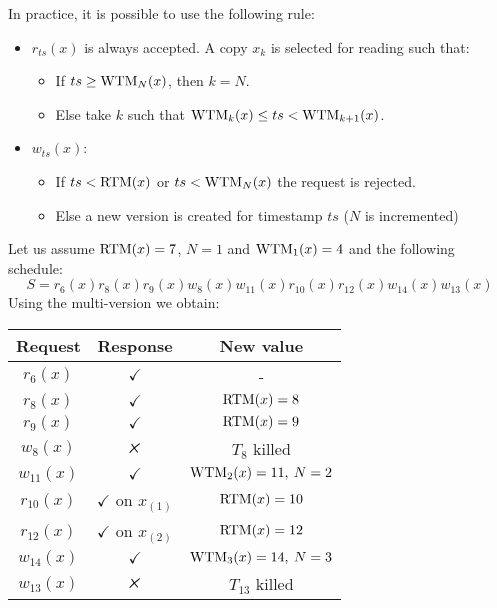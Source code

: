 In practice, it is possible to use the following rule: 
\begin{itemize}
    \item $r_{ts}(x)$ is always accepted. A copy $x_k$ is selected for reading such that:
        \begin{itemize}
            \item If $ts \geq \textnormal{WTM}_N(x)$, then $k=N$. 
            \item Else take $k$ such that $\textnormal{WTM}_k(x) \leq ts < \textnormal{WTM}_{k+1}(x)$. 
        \end{itemize}
    \item $w_{ts}(x)$:
        \begin{itemize}
            \item If $ts < \textnormal{RTM}(x)$ or $ts < \textnormal{WTM}_N(x)$ the request is rejected. 
            \item Else a new version is created for timestamp $ts$ ($N$ is incremented)
        \end{itemize}
\end{itemize}
\begin{example}
    Let us assume $\textnormal{RTM}(x)=7$, $N=1$ and $\textnormal{WTM}_1(x)=4$ and the following schedule: 
    \[S=r_6(x) r_8(x) r_9(x) w_8(x) w_{11}(x) r_{10}(x) r_{12}(x) w_{14}(x) w_{13}(x)\]
    Using the multi-version we obtain: 
    \begin{table}[H]
        \centering
        \begin{tabular}{ccc}
        \textbf{Request} & \textbf{Response}         & \textbf{New value}  \\ \hline
        $r_6(x)$         & $\checkmark$              & -                   \\
        $r_8(x)$         & $\checkmark$              & $\textnormal{RTM}(x)=8$          \\
        $r_9(x)$         & $\checkmark$              & $\textnormal{RTM}(x)=9$          \\
        $w_8(x)$         & $\tikzxmark$              & $T_8$ killed        \\
        $w_{11}(x)$      & $\checkmark$              & $\textnormal{WTM}_2(x)=11,\:N=2$ \\
        $r_{10}(x)$      & $\checkmark$ on $x_{(1)}$ & $\textnormal{RTM}(x)=10$         \\
        $r_{12}(x)$      & $\checkmark$ on $x_{(2)}$ & $\textnormal{RTM}(x)=12$         \\
        $w_{14}(x)$      & $\checkmark$              & $\textnormal{WTM}_3(x)=14,\:N=3$ \\
        $w_{13}(x)$      & $\tikzxmark$              & $T_{13}$ killed
        \end{tabular}
    \end{table}
\end{example}
